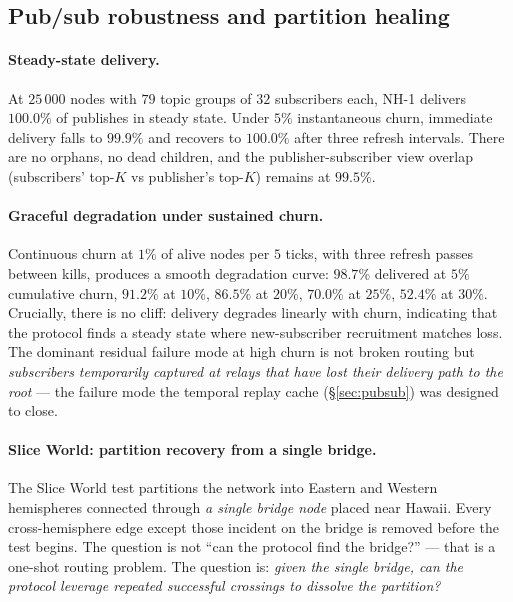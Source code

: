 \documentclass[conference]{IEEEtran}
\newcommand{\nhone}{NH-1\xspace}
\begin{document}
\subsection{Pub/sub robustness and partition healing}
\label{sec:eval-slice}

\paragraph{Steady-state delivery.} At $25\,000$ nodes with $79$ topic
groups of $32$ subscribers each, \nhone delivers $100.0\%$ of publishes
in steady state. Under $5\%$ instantaneous churn, immediate delivery
falls to $99.9\%$ and recovers to $100.0\%$ after three refresh
intervals. There are no orphans, no dead children, and the
publisher-subscriber view overlap (subscribers' top-$K$ vs publisher's
top-$K$) remains at $99.5\%$.

\paragraph{Graceful degradation under sustained churn.} Continuous
churn at $1\%$ of alive nodes per $5$ ticks, with three refresh passes
between kills, produces a smooth degradation curve: $98.7\%$ delivered
at $5\%$ cumulative churn, $91.2\%$ at $10\%$, $86.5\%$ at $20\%$,
$70.0\%$ at $25\%$, $52.4\%$ at $30\%$. Crucially, there is no cliff:
delivery degrades linearly with churn, indicating that the protocol
finds a steady state where new-subscriber recruitment matches
loss. The dominant residual failure mode at high churn is not broken
routing but \emph{subscribers temporarily captured at relays that have
lost their delivery path to the root} --- the failure mode the
temporal replay cache (\S\ref{sec:pubsub}) was designed to close.

\paragraph{Slice World: partition recovery from a single bridge.}
The Slice World test partitions the network into Eastern and Western
hemispheres connected through \emph{a single bridge node} placed near
Hawaii. Every cross-hemisphere edge except those incident on the
bridge is removed before the test begins. The question is not ``can
the protocol find the bridge?'' --- that is a one-shot routing
problem. The question is: \emph{given the single bridge, can the
protocol leverage repeated successful crossings to dissolve the
partition?}
\end{document}
